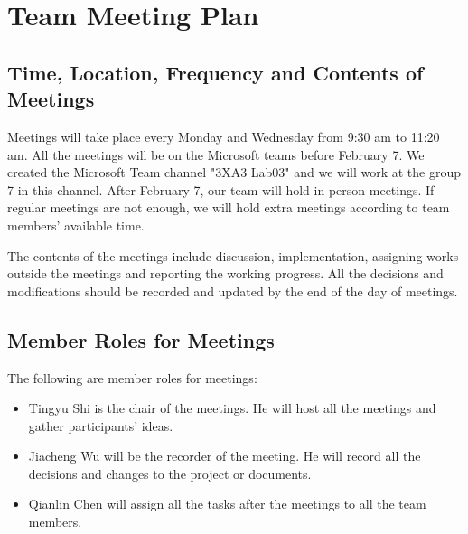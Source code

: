 \documentclass[12pt]{article}
\begin{document}
\section{Team Meeting Plan}
\subsection{Time, Location, Frequency and Contents of Meetings}
Meetings will take place every Monday and Wednesday from 9:30 am to 11:20 am. All the meetings will be on the Microsoft teams
before February 7. We created the Microsoft Team
channel "3XA3 Lab03" and we will work at the group 7 in this channel. After
February 7, our team 
will hold
in person meetings.
If regular meetings are
not enough, we will hold extra meetings
according to team members' available time.

\noindent The contents of the meetings
include discussion, implementation,
assigning works outside the meetings and
reporting the working progress. All the
decisions and modifications should be
recorded and updated by the end of the day
of meetings. 
\subsection{Member Roles for Meetings}
The following are member 
roles for meetings:
\begin{itemize}
\item Tingyu Shi is the chair of the
meetings. He will host all the
meetings and gather participants' ideas.
\item Jiacheng Wu will be the recorder of the
meeting. He will record all the decisions
and changes to the project or documents.
\item Qianlin Chen will assign all the tasks
after the meetings to all the team members.
\end{itemize}
\end{document}
